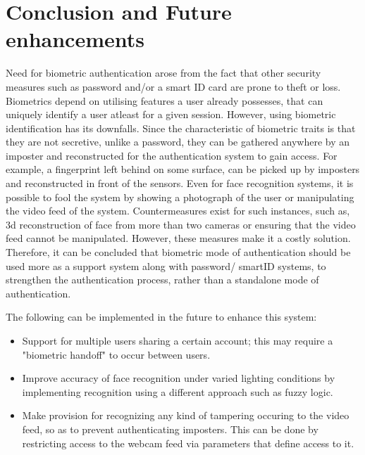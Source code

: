 \documentclass[%
        submission,
        notitlepage,
        narroweqnarray,
        inline,
        ]{ieee}
\begin{document}
\section{Conclusion and Future enhancements}
\noindent{}Need for biometric authentication arose from the fact that other security measures such as password and/or a smart ID card are prone to theft or loss. Biometrics depend on utilising features a user already possesses, that can uniquely identify a user atleast for a given session. However, using biometric identification has its downfalls. Since the characteristic of biometric traits is that they are not secretive, unlike a password, they can be gathered anywhere by an imposter and reconstructed for the authentication system to gain access. For example, a fingerprint left behind on some surface, can be picked up by imposters and reconstructed in front of the sensors. Even for face recognition systems, it is possible to fool the system by showing a photograph of the user or manipulating the video feed of the system. Countermeasures exist for such instances, such as, 3d reconstruction of face from more than two cameras or ensuring that the video feed cannot be manipulated. However, these measures make it a costly solution. Therefore, it can be concluded that biometric mode of authentication should be used more as a support system along with password/ smartID systems, to strengthen the authentication process, rather than a standalone mode of authentication.   

\noindent{}The following can be implemented in the future to enhance this system:
\begin{itemize}
\item Support for multiple users sharing a certain account; this may require a "biometric handoff" to occur between users.
\item Improve accuracy of face recognition under varied lighting conditions by implementing recognition using a different approach such as fuzzy logic.
\item Make provision for recognizing any kind of tampering occuring to the video feed, so as to prevent authenticating imposters. This can be done by restricting access to the webcam feed via parameters that define access to it.
\end{itemize}


\end{document}

